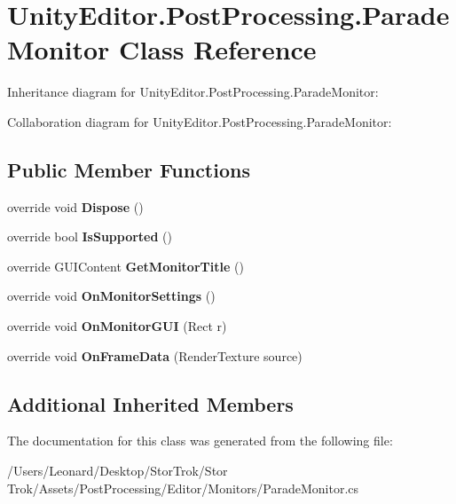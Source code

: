 \hypertarget{class_unity_editor_1_1_post_processing_1_1_parade_monitor}{}\section{Unity\+Editor.\+Post\+Processing.\+Parade\+Monitor Class Reference}
\label{class_unity_editor_1_1_post_processing_1_1_parade_monitor}


Inheritance diagram for Unity\+Editor.\+Post\+Processing.\+Parade\+Monitor\+:


Collaboration diagram for Unity\+Editor.\+Post\+Processing.\+Parade\+Monitor\+:
\subsection*{Public Member Functions}
\begin{DoxyCompactItemize}
\item 
\mbox{\label{class_unity_editor_1_1_post_processing_1_1_parade_monitor_a44b7cab29094f27567876326ed95532b}} 
override void {\bfseries Dispose} ()
\item 
\mbox{\label{class_unity_editor_1_1_post_processing_1_1_parade_monitor_a2dd290573b4cffc742c71023f6cf8e96}} 
override bool {\bfseries Is\+Supported} ()
\item 
\mbox{\label{class_unity_editor_1_1_post_processing_1_1_parade_monitor_a6cc2ec9d06d49a5449f5bff20e43d27d}} 
override G\+U\+I\+Content {\bfseries Get\+Monitor\+Title} ()
\item 
\mbox{\label{class_unity_editor_1_1_post_processing_1_1_parade_monitor_acd49021b355e14e3fe60feefe350a504}} 
override void {\bfseries On\+Monitor\+Settings} ()
\item 
\mbox{\label{class_unity_editor_1_1_post_processing_1_1_parade_monitor_add0c2d3325871b1df9e4e49302f0a426}} 
override void {\bfseries On\+Monitor\+G\+UI} (Rect r)
\item 
\mbox{\label{class_unity_editor_1_1_post_processing_1_1_parade_monitor_a8e49f6f541ec218ac719b87773deaae6}} 
override void {\bfseries On\+Frame\+Data} (Render\+Texture source)
\end{DoxyCompactItemize}
\subsection*{Additional Inherited Members}


The documentation for this class was generated from the following file\+:\begin{DoxyCompactItemize}
\item 
/\+Users/\+Leonard/\+Desktop/\+Stor\+Trok/\+Stor Trok/\+Assets/\+Post\+Processing/\+Editor/\+Monitors/Parade\+Monitor.\+cs\end{DoxyCompactItemize}
